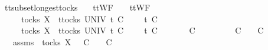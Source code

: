 \begin{isabellebody}
\isamarkupfalse%
%
\endisatagproof
{\isafoldproof}%
%
\isadelimproof
\isanewline
%
\endisadelimproof
\isanewline
{}\isamarkupfalse%
\ tt{\isacharunderscore}subset{\isacharunderscore}longest{\isacharunderscore}tocks{\isacharcolon}\isanewline
\ \ \ {\isachardoublequoteopen}ttWF\ {\isacharparenleft}{\isasymrho}{\isacharprime}\ {\isacharat}\ {\isasymsigma}{\isacharprime}{\isacharparenright}{\isachardoublequoteclose}\ {\isachardoublequoteopen}ttWF\ {\isacharparenleft}{\isasymrho}\ {\isacharat}\ {\isasymsigma}{\isacharparenright}{\isachardoublequoteclose}\isanewline
\ \ \ {\isachardoublequoteopen}{\isasymrho}\ {\isasymin}\ tocks\ X{\isachardoublequoteclose}\ {\isachardoublequoteopen}{\isasymforall}\ t{\isasymin}tocks\ UNIV{\isachardot}\ t\ {\isasymle}\isactrlsub C\ {\isasymrho}\ {\isacharat}\ {\isasymsigma}\ {\isasymlongrightarrow}\ t\ {\isasymle}\isactrlsub C\ {\isasymrho}{\isachardoublequoteclose}\isanewline
\ \ \ {\isachardoublequoteopen}{\isasymrho}{\isacharprime}\ {\isasymin}\ tocks\ X{\isachardoublequoteclose}\ {\isachardoublequoteopen}{\isasymforall}\ t{\isasymin}tocks\ UNIV{\isachardot}\ t\ {\isasymle}\isactrlsub C\ {\isasymrho}{\isacharprime}\ {\isacharat}\ {\isasymsigma}{\isacharprime}\ {\isasymlongrightarrow}\ t\ {\isasymle}\isactrlsub C\ {\isasymrho}{\isacharprime}{\isachardoublequoteclose}\isanewline
\ \ \ {\isachardoublequoteopen}{\isasymrho}{\isacharprime}\ {\isacharat}\ {\isasymsigma}{\isacharprime}\ {\isasymsubseteq}\isactrlsub C\ {\isasymrho}\ {\isacharat}\ {\isasymsigma}{\isachardoublequoteclose}\ \ \isanewline
\ \ \ {\isachardoublequoteopen}{\isasymrho}{\isacharprime}\ {\isasymsubseteq}\isactrlsub C\ {\isasymrho}\ {\isasymand}\ {\isasymsigma}{\isacharprime}\ {\isasymsubseteq}\isactrlsub C\ {\isasymsigma}{\isachardoublequoteclose}\isanewline
%
\isadelimproof
%
\endisadelimproof
%
\isatagproof
{}\isamarkupfalse%
\ {\isacharminus}\isanewline
\ \ \isamarkupfalse%
\ {\isasymrho}{\isacharprime}{\isacharprime}\ \ {\isasymrho}{\isacharprime}{\isacharprime}{\isacharunderscore}assms{\isacharcolon}\ {\isachardoublequoteopen}{\isasymrho}{\isacharprime}{\isacharprime}{\isasymin}\ tocks\ X\ {\isasymand}\ {\isasymrho}{\isacharprime}{\isacharprime}\ {\isasymsubseteq}\isactrlsub C\ {\isasymrho}\ {\isasymand}\ {\isasymrho}{\isacharprime}{\isacharprime}\ {\isasymle}\isactrlsub C\ {\isasymrho}{\isacharprime}\ {\isacharat}\ {\isasymsigma}{\isacharprime}{\isachardoublequoteclose}\isanewline

\end{isabellebody}
